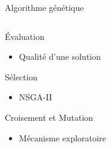 \begin{frame}{Algorithme génétique}
\begin{columns}
\begin{column}{0.48\textwidth}
        \begin{block}{Évaluation}
          \begin{itemize}
            \item Qualité d'une solution
          \end{itemize}
        \end{block}
        \begin{block}{Sélection}
          \begin{itemize}
            \item NSGA-II
          \end{itemize}
        \end{block}
        \begin{block}{Croisement et Mutation}
          \begin{itemize}
            \item Mécanisme exploratoire
          \end{itemize}
        \end{block}
      \end{column}
  \end{columns}
\end{frame}

